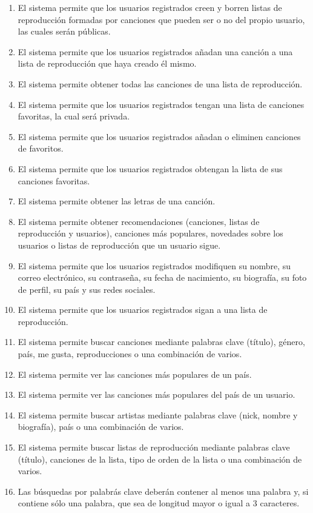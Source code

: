 \documentclass[12pt]{article}%
\begin{document}
\begin{enumerate}
	\item El sistema permite que los usuarios registrados creen y borren listas de reproducci\'on formadas por canciones que pueden ser o no del propio usuario, las cuales ser\'an p\'ublicas.
	\item El sistema permite que los usuarios registrados a\~nadan una canci\'on a una lista de reproducci\'on que haya creado \'el mismo.
	\item El sistema permite obtener todas las canciones de una lista de reproducci\'on.

	\item El sistema permite que los usuarios registrados tengan una lista de canciones favoritas, la cual ser\'a privada.
	\item El sistema permite que los usuarios registrados añadan o eliminen canciones de favoritos.
	\item El sistema permite que los usuarios registrados obtengan la lista de sus canciones favoritas.
	\item El sistema permite obtener las letras de una canci\'on.
	
	\item El sistema permite obtener recomendaciones (canciones, listas de reproducci\'on y usuarios), canciones m\'as populares, novedades sobre los usuarios o listas de reproducci\'on que un usuario sigue. 
	
	\item El sistema permite que los usuarios registrados modifiquen su nombre, su correo electr\'onico, su contrase\~na, su fecha de nacimiento, su biograf\'ia, su foto de perfil, su pa\'is y sus redes sociales.
	\item El sistema permite que los usuarios registrados sigan a una lista de reproducci\'on.
	\item El sistema permite buscar canciones mediante palabras clave (t\'itulo), g\'enero, pa\'is, me gusta, reproducciones o una combinaci\'on de varios.
	\item El sistema permite ver las canciones m\'as populares de un pa\'is.
	\item El sistema permite ver las canciones m\'as populares del pa\'is de un usuario.
	
	\item El sistema permite buscar artistas mediante palabras clave (nick, nombre y biograf\'ia), pa\'is o una combinaci\'on de varios.
	\item El sistema permite buscar listas de reproducci\'on mediante palabras clave (t\'itulo), canciones de la lista, tipo de orden de la lista o una combinaci\'on de varios.
	
	\item Las b\'usquedas por palabr\'as clave deber\'an contener al menos una palabra y, si contiene s\'olo una palabra, que sea de longitud mayor o igual a 3 caracteres.

\end{enumerate}
\end{document}
